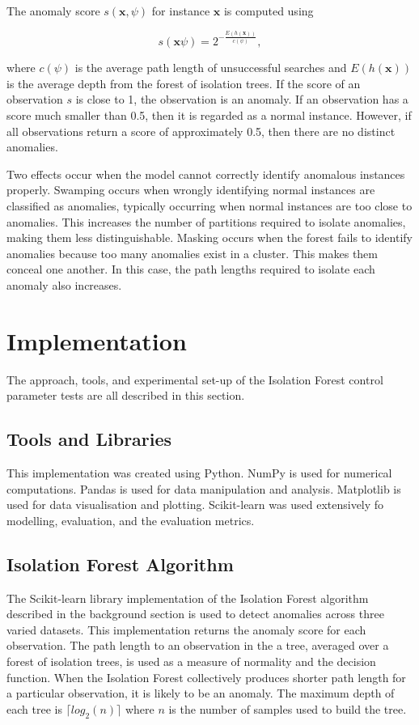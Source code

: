 \documentclass[10pt, conference]{IEEEtran}
\begin{document}
The anomaly score $s(\boldsymbol{x}, \psi)$ for instance $\boldsymbol{x}$ is computed using

\begin{equation}
	s(\boldsymbol{x} \psi) = 2^{- \frac{E(h(\boldsymbol{x}))}{c(\psi)}},
\end{equation}

where $c(\psi)$ is the average path length of unsuccessful searches and $E(h(\boldsymbol{x}))$ is the average depth from the forest of isolation trees. If the score of an observation $s$ is close to 1, the observation is an anomaly. If an observation has a score much smaller than 0.5, then it is regarded as a normal instance. However, if all observations return a score of approximately 0.5, then there are no distinct anomalies.

Two effects occur when the model cannot correctly identify anomalous instances properly. Swamping occurs when wrongly identifying normal instances are classified as anomalies, typically occurring when normal instances are too close to anomalies. This increases the number of partitions required to isolate anomalies, making them less distinguishable. Masking occurs when the forest fails to identify anomalies because too many anomalies exist in a cluster. This makes them conceal one another. In this case, the path lengths required to isolate each anomaly also increases.


\section{Implementation}
The approach, tools, and experimental set-up of the Isolation Forest control parameter tests are all described in this section.
\subsection{Tools and Libraries}
This implementation was created using Python. NumPy\cite{harris2020array} is used for numerical computations. Pandas\cite{reback2020pandas} is used for data manipulation and analysis. Matplotlib\cite{Hunter:2007} is used for data visualisation and plotting. Scikit-learn\cite{scikit-learn} was used extensively fo modelling, evaluation, and the evaluation metrics.
\subsection{Isolation Forest Algorithm}
The Scikit-learn library \cite{scikit-learn} implementation of the Isolation Forest algorithm described in the background section is used to detect anomalies across three varied datasets. This implementation returns the anomaly score for each observation. The path length to an observation in the a tree, averaged over a forest of isolation trees, is used as a measure of normality and the decision function. When the Isolation Forest collectively produces shorter path length for a particular observation, it is likely to be an anomaly. The maximum depth of each tree is $\lceil log_2(n) \rceil$ where $n$ is the number of samples used to build the tree.
\end{document}
